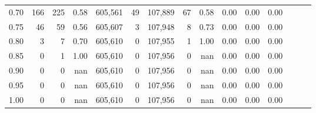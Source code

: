\begin{tabular}{rrrrrrrrrrrrrrr}
0.70 &      166 &     225 &  0.58 &  605,561 &       49 &  107,889 &       67 &  0.58 &  0.00 &  0.00 &      0.00 \\
0.75 &       46 &      59 &  0.56 &  605,607 &        3 &  107,948 &        8 &  0.73 &  0.00 &  0.00 &      0.00 \\
0.80 &        3 &       7 &  0.70 &  605,610 &        0 &  107,955 &        1 &  1.00 &  0.00 &  0.00 &      0.00 \\
0.85 &        0 &       1 &  1.00 &  605,610 &        0 &  107,956 &        0 &   nan &  0.00 &  0.00 &      0.00 \\
0.90 &        0 &       0 &   nan &  605,610 &        0 &  107,956 &        0 &   nan &  0.00 &  0.00 &      0.00 \\
0.95 &        0 &       0 &   nan &  605,610 &        0 &  107,956 &        0 &   nan &  0.00 &  0.00 &      0.00 \\
1.00 &        0 &       0 &   nan &  605,610 &        0 &  107,956 &        0 &   nan &  0.00 &  0.00 &      0.00 \\
\bottomrule
\end{tabular}
